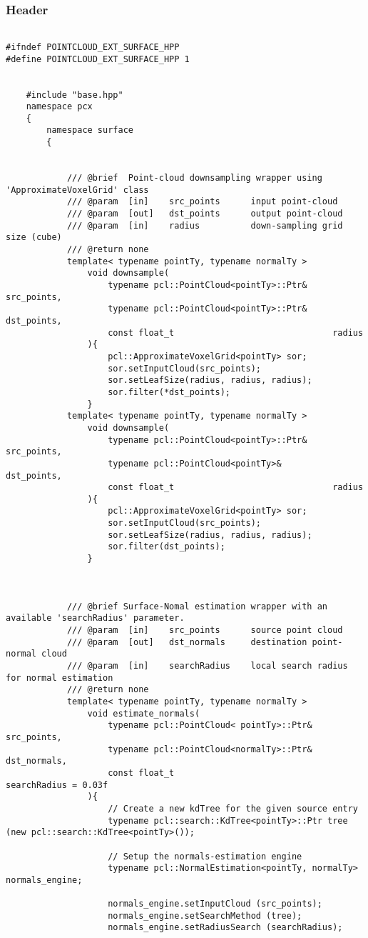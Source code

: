 \subsubsection{Header}
\begin{lstlisting}

#ifndef POINTCLOUD_EXT_SURFACE_HPP
#define POINTCLOUD_EXT_SURFACE_HPP 1

	
	#include "base.hpp"
	namespace pcx
	{
		namespace surface
		{


			/// @brief 	Point-cloud downsampling wrapper using 'ApproximateVoxelGrid' class
			///	@param 	[in]	src_points 		input point-cloud
			///	@param 	[out]	dst_points 		output point-cloud
			/// @param 	[in]	radius			down-sampling grid size (cube)
			/// @return none
			template< typename pointTy, typename normalTy >
				void downsample(
					typename pcl::PointCloud<pointTy>::Ptr&  	src_points,
					typename pcl::PointCloud<pointTy>::Ptr&  	dst_points,
					const float_t 								radius
				){
					pcl::ApproximateVoxelGrid<pointTy> sor;
					sor.setInputCloud(src_points);
					sor.setLeafSize(radius, radius, radius);
					sor.filter(*dst_points);
				}
			template< typename pointTy, typename normalTy >
				void downsample(
					typename pcl::PointCloud<pointTy>::Ptr&  	src_points,
					typename pcl::PointCloud<pointTy>&  		dst_points,
					const float_t 								radius
				){
					pcl::ApproximateVoxelGrid<pointTy> sor;
					sor.setInputCloud(src_points);
					sor.setLeafSize(radius, radius, radius);
					sor.filter(dst_points);
				}



			/// @brief Surface-Nomal estimation wrapper with an available 'searchRadius' parameter.
			///	@param 	[in]	src_points 		source point cloud
			///	@param 	[out]	dst_normals 	destination point-normal cloud
			/// @param 	[in]	searchRadius	local search radius for normal estimation
			/// @return none
			template< typename pointTy, typename normalTy >
				void estimate_normals(
					typename pcl::PointCloud< pointTy>::Ptr&  	src_points,
					typename pcl::PointCloud<normalTy>::Ptr&  	dst_normals,
					const float_t 								searchRadius = 0.03f
				){
					// Create a new kdTree for the given source entry
					typename pcl::search::KdTree<pointTy>::Ptr tree (new pcl::search::KdTree<pointTy>());

					// Setup the normals-estimation engine
					typename pcl::NormalEstimation<pointTy, normalTy> normals_engine;

					normals_engine.setInputCloud (src_points);
					normals_engine.setSearchMethod (tree);
					normals_engine.setRadiusSearch (searchRadius);


\end{lstlisting}
